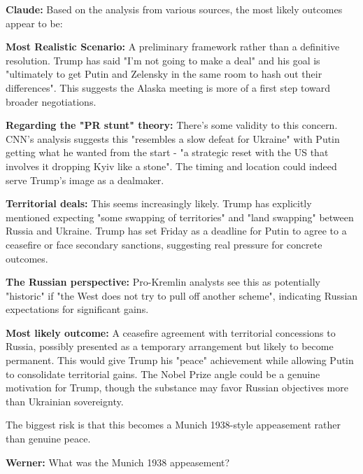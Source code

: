 \documentclass[11pt,a5paper]{scrartcl}
\begin{document}
\begin{claudebox}
\textbf{Claude:} Based on the analysis from various sources, the most likely outcomes appear to be:

\textbf{Most Realistic Scenario:} A preliminary framework rather than a definitive resolution. Trump has said "I'm not going to make a deal" and his goal is "ultimately to get Putin and Zelensky in the same room to hash out their differences". This suggests the Alaska meeting is more of a first step toward broader negotiations.

\textbf{Regarding the "PR stunt" theory:} There's some validity to this concern. CNN's analysis suggests this "resembles a slow defeat for Ukraine" with Putin getting what he wanted from the start - "a strategic reset with the US that involves it dropping Kyiv like a stone". The timing and location could indeed serve Trump's image as a dealmaker.

\textbf{Territorial deals:} This seems increasingly likely. Trump has explicitly mentioned expecting "some swapping of territories" and "land swapping" between Russia and Ukraine. Trump has set Friday as a deadline for Putin to agree to a ceasefire or face secondary sanctions, suggesting real pressure for concrete outcomes.

\textbf{The Russian perspective:} Pro-Kremlin analysts see this as potentially "historic" if "the West does not try to pull off another scheme", indicating Russian expectations for significant gains.

\textbf{Most likely outcome:} A ceasefire agreement with territorial concessions to Russia, possibly presented as a temporary arrangement but likely to become permanent. This would give Trump his "peace" achievement while allowing Putin to consolidate territorial gains. The Nobel Prize angle could be a genuine motivation for Trump, though the substance may favor Russian objectives more than Ukrainian sovereignty.

The biggest risk is that this becomes a Munich 1938-style appeasement rather than genuine peace.
\end{claudebox}

\begin{humanbox}
\textbf{Werner:} What was the Munich 1938 appeasement?
\end{humanbox}
\end{document}
